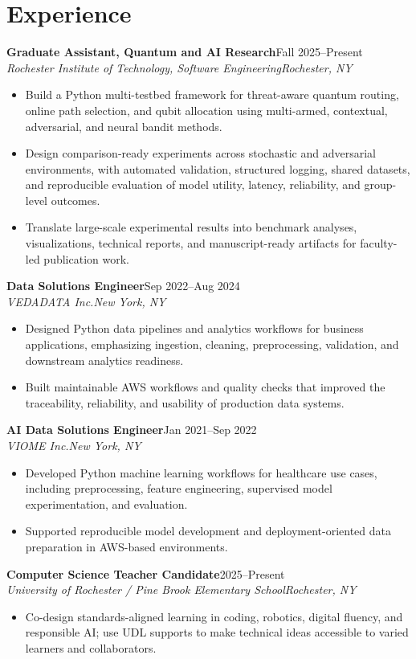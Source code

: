 \documentclass[10pt,letterpaper]{article}
\newcommand{\role}[4]{%
  \textbf{#1}\hfill #2\\
  \textit{#3}\hfill \textit{#4}\vspace{-3pt}
}
\begin{document}
\section*{Experience}
\role{Graduate Assistant, Quantum and AI Research}{Fall 2025--Present}
{Rochester Institute of Technology, Software Engineering}{Rochester, NY}
\begin{itemize}
  \item Build a Python multi-testbed framework for threat-aware quantum routing,
    online path selection, and qubit allocation using multi-armed, contextual,
    adversarial, and neural bandit methods.
  \item Design comparison-ready experiments across stochastic and adversarial
    environments, with automated validation, structured logging, shared datasets,
    and reproducible evaluation of model utility, latency, reliability, and
    group-level outcomes.
  \item Translate large-scale experimental results into benchmark analyses,
    visualizations, technical reports, and manuscript-ready artifacts for
    faculty-led publication work.
\end{itemize}

\role{Data Solutions Engineer}{Sep 2022--Aug 2024}
{VEDADATA Inc.}{New York, NY}
\begin{itemize}
  \item Designed Python data pipelines and analytics workflows for business
    applications, emphasizing ingestion, cleaning, preprocessing, validation,
    and downstream analytics readiness.
  \item Built maintainable AWS workflows and quality checks that improved the
    traceability, reliability, and usability of production data systems.
\end{itemize}

\role{AI Data Solutions Engineer}{Jan 2021--Sep 2022}
{VIOME Inc.}{New York, NY}
\begin{itemize}
  \item Developed Python machine learning workflows for healthcare use cases,
    including preprocessing, feature engineering, supervised model
    experimentation, and evaluation.
  \item Supported reproducible model development and deployment-oriented data
    preparation in AWS-based environments.
\end{itemize}

\role{Computer Science Teacher Candidate}{2025--Present}
{University of Rochester / Pine Brook Elementary School}{Rochester, NY}
\begin{itemize}
  \item Co-design standards-aligned learning in coding, robotics, digital
    fluency, and responsible AI; use UDL supports to make technical ideas
    accessible to varied learners and collaborators.
\end{itemize}
\end{document}
